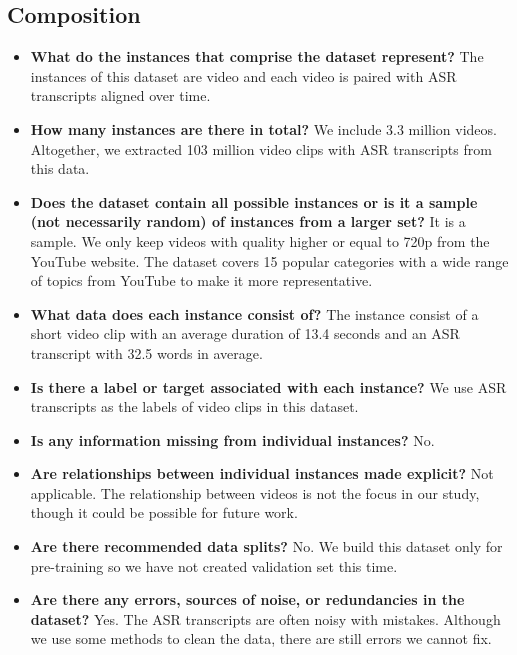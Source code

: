 \subsection{Composition}

\begin{itemize}

\item \textbf{What do the instances that comprise the dataset represent?} 
The instances of this dataset are video and each video is paired with ASR transcripts aligned over time.

\item \textbf{How many instances are there in total?}
We include 3.3 million videos. Altogether, we extracted 103 million video clips with ASR transcripts from this data.

\item \textbf{Does the dataset contain all possible instances or is it a sample (not necessarily random) of instances from a larger set?}
It is a sample. We only keep videos with quality higher or equal to 720p from the YouTube website. The dataset covers 15 popular categories with a wide range of topics from YouTube to make it more representative.

\item \textbf{What data does each instance consist of?} 
The instance consist of a short video clip with an average duration of 13.4 seconds and an ASR transcript with 32.5 words in average.

\item \textbf{Is there a label or target associated with each instance?}
We use ASR transcripts as the labels of video clips in this dataset.

\item \textbf{Is any information missing from individual instances?}
No.

\item \textbf{Are relationships between individual instances made explicit?}
Not applicable. The relationship between videos is not the focus in our study, though it could be possible for future work.

\item \textbf{Are there recommended data splits?} 
No. We build this dataset only for pre-training so we have not created validation set this time.

\item \textbf{Are there any errors, sources of noise, or redundancies in the dataset?} 
Yes. The ASR transcripts are often noisy with mistakes. Although we use some methods to clean the data, there are still errors we cannot fix.


\end{itemize}
